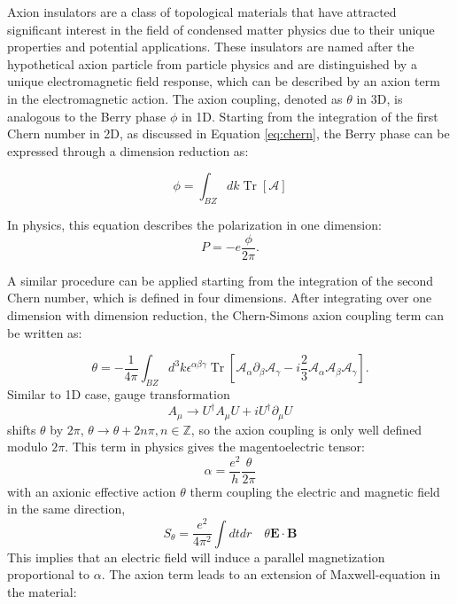 Axion insulators are a class of topological materials that have attracted significant interest in the field of condensed matter physics due to their unique properties and potential applications. These insulators are named after the hypothetical axion particle from particle physics and are distinguished by a unique electromagnetic field response, which can be described by an axion term in the electromagnetic action\cite{peccei1977cp, wilczek1987two,svrcek2006axions}. The axion coupling, denoted as $\theta$ in 3D, is analogous to the Berry phase 
$\phi$ in 1D. 
Starting from the integration of the first Chern number in 2D, as discussed in Equation \ref{eq:chern}, the Berry phase can be expressed through a dimension reduction as:

\begin{equation}
\phi=\int_{B Z} d k \operatorname{Tr}[\mathcal{A}]
\end{equation}

In physics, this equation describes the polarization in one dimension:
\begin{equation}
P=-e\frac{\phi}{2\pi}.
\end{equation}

A similar procedure can be applied starting from the integration of the second Chern number, which is defined in four dimensions. After integrating over one dimension with dimension reduction, the Chern-Simons axion coupling term can be written as:

\begin{equation}
\theta=-\frac{1}{4 \pi} \int_{B Z} d^3 k \epsilon^{\alpha \beta \gamma} \operatorname{Tr}\left[\mathcal{A}_\alpha \partial_\beta \mathcal{A}_\gamma-i \frac{2}{3} \mathcal{A}_\alpha \mathcal{A}_\beta \mathcal{A}_\gamma\right].
\end{equation}
Similar to 1D case, gauge transformation
\begin{equation}
A_\mu \longrightarrow U^{\dagger} A_\mu U+i U^{\dagger} \partial_\mu U
\end{equation}
shifts $\theta$ by $2\pi$, $\theta\rightarrow\theta+2n\pi, n\in\mathbb{Z}$, so the axion coupling is only well defined modulo $2\pi$. This term in physics gives the magentoelectric tensor:
\begin{equation}
    \alpha=\frac{e^2}{h}\frac{\theta}{2\pi}
\end{equation}
with an axionic effective action $\theta$ therm coupling the electric and magnetic field in the same direction,
\begin{equation}
    S_\theta=\frac{e^2}{4\pi^2}\int dt dr\quad \theta\mathbf{E}\cdot\mathbf{B}
\end{equation}
This implies that an electric field will induce a parallel magnetization proportional to  $\alpha$. The axion term leads to an extension of Maxwell-equation in the material: 

